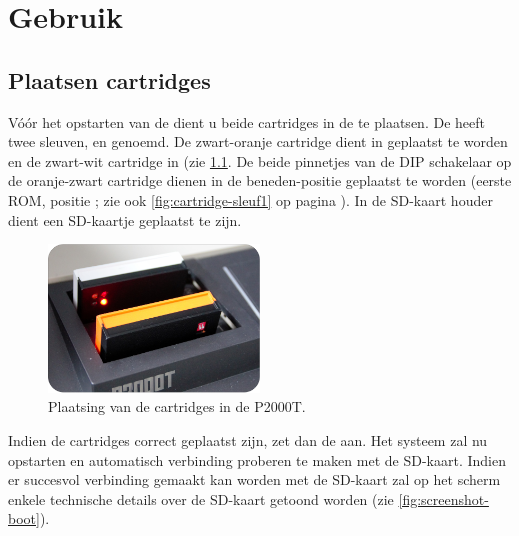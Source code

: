 \chapter{Gebruik}
\chapterpreamble

\label{chap:usage}

%
%
%
\section{Plaatsen cartridges}

Vóór het opstarten van de  dient u beide cartridges in de  te plaatsen. De  heeft twee sleuven,  en  genoemd. De zwart-oranje cartridge dient in  geplaatst te worden en de zwart-wit cartridge in  (zie \cref{fig:placement-cartridges}. De beide pinnetjes van de DIP schakelaar op de oranje-zwart cartridge dienen in de beneden-positie geplaatst te worden (eerste ROM, positie ; zie ook \cref{fig:cartridge-sleuf1} op pagina \pageref{fig:cartridge-sleuf1}). In de SD-kaart houder dient een SD-kaartje geplaatst te zijn.

\begin{figure}[h!]
    \centering
    \includegraphics[width=0.50\textwidth]{img/placement-cartridges.png}
    \caption{Plaatsing van de cartridges in de P2000T.}
    \label{fig:placement-cartridges}
\end{figure}

Indien de cartridges correct geplaatst zijn, zet dan de  aan. Het systeem zal nu opstarten en automatisch verbinding proberen te maken met de SD-kaart. Indien er succesvol verbinding gemaakt kan worden met de SD-kaart zal op het scherm enkele technische details over de SD-kaart getoond worden (zie \cref{fig:screenshot-boot}).


